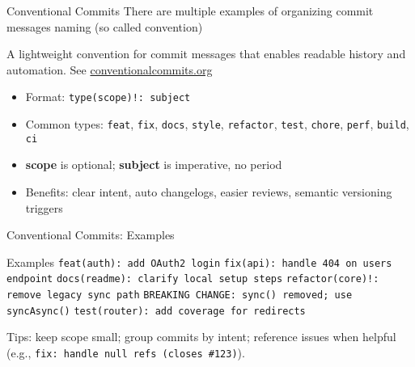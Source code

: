 \documentclass{beamer}
\begin{document}
\begin{frame}{Conventional Commits}
  There are multiple examples of organizing commit messages naming (so called convention)

  \footnotesize
  A lightweight convention for commit messages that enables readable history and automation. See \href{https://www.conventionalcommits.org/}{conventionalcommits.org}
  \begin{itemize}
    \item Format: \texttt{type(scope)!: subject}
    \item Common types: \texttt{feat}, \texttt{fix}, \texttt{docs}, \texttt{style},
      \texttt{refactor}, \texttt{test}, \texttt{chore}, \texttt{perf}, \texttt{build}, \texttt{ci}
    \item \textbf{scope} is optional; \textbf{subject} is imperative, no period
    \item Benefits: clear intent, auto changelogs, easier reviews, semantic versioning triggers
  \end{itemize}
\end{frame}

\begin{frame}{Conventional Commits: Examples}
  \begin{block}{Examples}
    \texttt{feat(auth): add OAuth2 login}\newline
    \texttt{fix(api): handle 404 on users endpoint}\newline
    \texttt{docs(readme): clarify local setup steps}\newline
    \texttt{refactor(core)!: remove legacy sync path}\newline
    \texttt{BREAKING CHANGE: sync() removed; use syncAsync()}\newline
    \texttt{test(router): add coverage for redirects}
  \end{block}
  \vspace{0.4em}
  Tips: keep scope small; group commits by intent; reference issues when helpful (e.g., \texttt{fix: handle null refs (closes \#123)}).
\end{frame}
\end{document}
